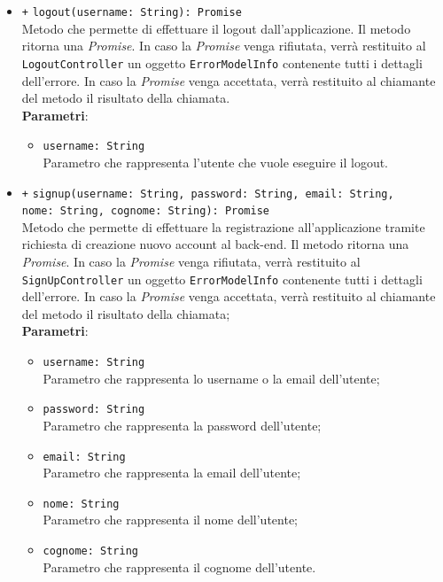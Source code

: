 \begin{itemize}
\begin{itemize}
		\item \texttt{+} \texttt{logout(username: String): Promise} \\ Metodo che permette di effettuare il logout dall'applicazione. Il metodo ritorna una \textit{Promise}. In caso la \textit{Promise} venga rifiutata, verrà restituito al \texttt{LogoutController} un oggetto \texttt{ErrorModelInfo} contenente tutti i dettagli dell'errore. In caso la \textit{Promise} venga accettata, verrà restituito al chiamante del metodo il risultato della chiamata.\\
		\textbf{Parametri}:
		\begin{itemize}
			\item \texttt{username: String} \\ Parametro che rappresenta l'utente che vuole eseguire il logout.
		\end{itemize}
		
		\item \texttt{+} \texttt{signup(username: String, password: String, email: String, \\ nome: String, cognome: String): Promise} \\Metodo che permette di effettuare la registrazione all'applicazione tramite richiesta di creazione nuovo account al back-end. Il metodo ritorna una \textit{Promise}. In caso la \textit{Promise} venga rifiutata, verrà restituito al \texttt{SignUpController} un oggetto \texttt{ErrorModelInfo} contenente tutti i dettagli dell'errore. In caso la \textit{Promise} venga accettata, verrà restituito al chiamante del metodo il risultato della chiamata; \\
			\textbf{Parametri}:
			\begin{itemize}
				\item \texttt{username: String} \\ Parametro che rappresenta lo username o la email dell'utente;
				\item \texttt{password: String} \\ Parametro che rappresenta la password dell'utente;
				\item \texttt{email: String} \\ Parametro che rappresenta la email dell'utente;
				\item \texttt{nome: String} \\ Parametro che rappresenta il nome dell'utente;
				\item \texttt{cognome: String} \\ Parametro che rappresenta il cognome dell'utente.
			\end{itemize}
			

\end{itemize}
\end{itemize}
